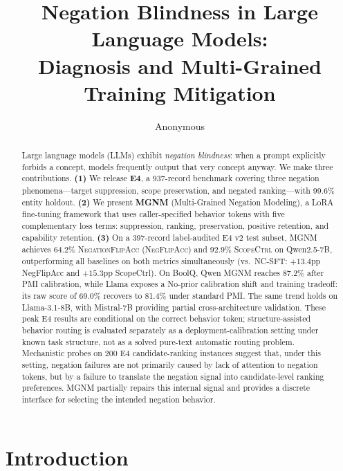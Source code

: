 \documentclass[letterpaper]{article}
\title{Negation Blindness in Large Language Models:\\
Diagnosis and Multi-Grained Training Mitigation}
\author{Anonymous}
\begin{document}
\maketitle

\begin{abstract}
Large language models (LLMs) exhibit \emph{negation blindness}: when
a prompt explicitly forbids a concept, models frequently output that
very concept anyway.
We make three contributions.
\textbf{(1)} We release \textbf{E4}, a 937-record benchmark covering three
negation phenomena---target suppression, scope preservation, and
negated ranking---with 99.6\% entity holdout.
\textbf{(2)} We present \textbf{MGNM} (Multi-Grained Negation Modeling), a
LoRA fine-tuning framework that uses caller-specified behavior tokens with
five complementary loss terms: suppression, ranking, preservation, positive
retention, and capability retention.
\textbf{(3)} On a 397-record label-audited E4 v2 test subset, MGNM achieves
64.2\% \textsc{NegationFlipAcc} (\textsc{NegFlipAcc}) and 92.9\% \textsc{ScopeCtrl} on Qwen2.5-7B,
outperforming all baselines on both metrics simultaneously
(vs.\ NC-SFT: $+13.4$pp NegFlipAcc and $+15.3$pp ScopeCtrl).
On BoolQ, Qwen MGNM reaches 87.2\% after PMI calibration, while Llama
exposes a No-prior calibration shift and training tradeoff: its raw score of
69.0\% recovers to 81.4\% under standard PMI.
The same trend holds on Llama-3.1-8B, with Mistral-7B providing partial
cross-architecture validation.
These peak E4 results are conditional on the correct behavior token;
structure-assisted behavior routing is evaluated separately as a
deployment-calibration setting under known task structure, not as a solved
pure-text automatic routing problem.
Mechanistic probes on 200 E4 candidate-ranking instances suggest that,
under this setting, negation failures are not primarily caused by lack
of attention to negation tokens, but by a failure to translate the
negation signal into candidate-level ranking preferences.
MGNM partially repairs this internal signal and provides a discrete interface
for selecting the intended negation behavior.
\end{abstract}

\section{Introduction}
\label{sec:intro}
\end{document}
